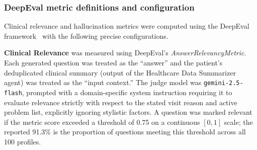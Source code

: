 \documentclass[sigplan,screen]{acmart}
\begin{document}

\subsubsection{DeepEval metric definitions and configuration}
Clinical relevance and hallucination metrics were computed using the DeepEval
framework~\cite{deepeval} with the following precise configurations.

\noindent\textbf{Clinical Relevance} was measured using DeepEval's \textit{AnswerRelevancyMetric}. Each generated question was treated as the
``answer'' and the patient's deduplicated clinical summary (output of the
Healthcare Data Summarizer agent) was treated as the ``input context.'' The
judge model was \texttt{gemini-2.5-flash}, prompted with a domain-specific
system instruction requiring it to evaluate relevance strictly with respect to
the stated visit reason and active problem list, explicitly ignoring stylistic
factors. A question was marked relevant if the metric score exceeded a threshold
of 0.75 on a continuous $[0, 1]$ scale; the reported 91.3\% is the proportion
of questions meeting this threshold across all 100 profiles.
\end{document}
